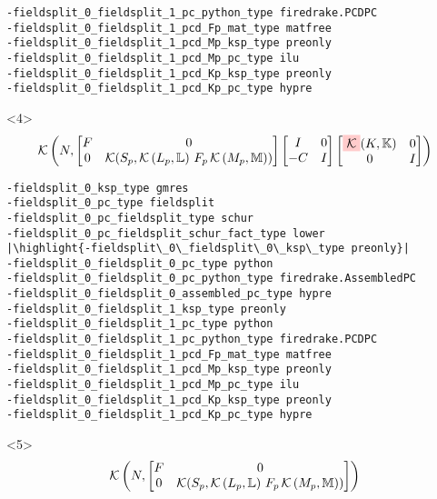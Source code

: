 \documentclass[presentation]{beamer}
\newcommand{\KSP}[2]{\ensuremath{\mathcal{K}\left(#1, \mathbb{#2}\right)}}
\newcommand{\highlight}[1]{\colorbox{red!20}{\color{black} #1}}
\begin{document}
\begin{frame}[fragile]
\begin{onlyenv}
\begin{verbatim}
-fieldsplit_0_fieldsplit_1_pc_python_type firedrake.PCDPC
-fieldsplit_0_fieldsplit_1_pcd_Fp_mat_type matfree
-fieldsplit_0_fieldsplit_1_pcd_Mp_ksp_type preonly
-fieldsplit_0_fieldsplit_1_pcd_Mp_pc_type ilu
-fieldsplit_0_fieldsplit_1_pcd_Kp_ksp_type preonly
-fieldsplit_0_fieldsplit_1_pcd_Kp_pc_type hypre
\end{verbatim}
  \end{onlyenv}
  \begin{onlyenv}<4>
    \color{gray}
    \begin{equation*}
      \KSP{N}{%
        \begin{bmatrix}
        F & 0 \\
        0 & \mathcal{K}(S_p, \KSP{L_p}{L}\,F_p \, \KSP{M_p}{M})
      \end{bmatrix}
      \begin{bmatrix}
        I & 0\\
        -C & I
      \end{bmatrix}
      \begin{bmatrix}
        \highlight{$\mathcal{K}$}(K, \mathbb{K}) & 0 \\
        0 & I
      \end{bmatrix}}
    \end{equation*}
\begin{verbatim}
-fieldsplit_0_ksp_type gmres
-fieldsplit_0_pc_type fieldsplit
-fieldsplit_0_pc_fieldsplit_type schur
-fieldsplit_0_pc_fieldsplit_schur_fact_type lower
|\highlight{-fieldsplit\_0\_fieldsplit\_0\_ksp\_type preonly}|
-fieldsplit_0_fieldsplit_0_pc_type python
-fieldsplit_0_fieldsplit_0_pc_python_type firedrake.AssembledPC
-fieldsplit_0_fieldsplit_0_assembled_pc_type hypre
-fieldsplit_0_fieldsplit_1_ksp_type preonly
-fieldsplit_0_fieldsplit_1_pc_type python
-fieldsplit_0_fieldsplit_1_pc_python_type firedrake.PCDPC
-fieldsplit_0_fieldsplit_1_pcd_Fp_mat_type matfree
-fieldsplit_0_fieldsplit_1_pcd_Mp_ksp_type preonly
-fieldsplit_0_fieldsplit_1_pcd_Mp_pc_type ilu
-fieldsplit_0_fieldsplit_1_pcd_Kp_ksp_type preonly
-fieldsplit_0_fieldsplit_1_pcd_Kp_pc_type hypre
\end{verbatim}
  \end{onlyenv}
  \begin{onlyenv}<5>
    \color{gray}
    \begin{equation*}
      \KSP{N}{%
        \begin{bmatrix}
        F & 0 \\
        0 & \mathcal{K}(S_p, \KSP{L_p}{L}\,F_p \, \KSP{M_p}{M})

\end{bmatrix}}
\end{equation*}
\end{onlyenv}
\end{frame}
\end{document}
